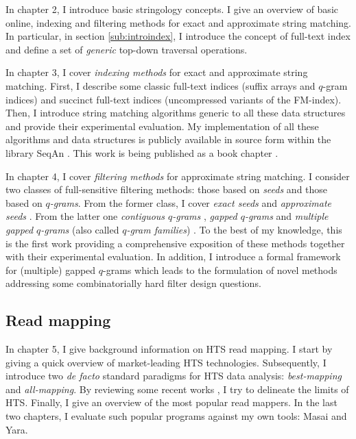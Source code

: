 In chapter 2, I introduce basic stringology concepts.
I give an overview of basic online, indexing and filtering methods for exact and approximate string matching.
In particular, in section \ref{sub:introindex}, I introduce the concept of full-text index and define a set of \emph{generic} top-down traversal operations.

In chapter 3, I cover \emph{indexing methods} for exact and approximate string matching.
First, I describe some classic full-text indices (suffix arrays and $q$-gram indices) and succinct full-text indices (uncompressed variants of the FM-index).
Then, I introduce string matching algorithms generic to all these data structures and provide their experimental evaluation.
My implementation of all these algorithms and data structures is publicly available in source form within the \CC library SeqAn \citep{Doering2008}.
This work is being published as a book chapter \citep{Weese2015}.

In chapter 4, I cover \emph{filtering methods} for approximate string matching.
I consider two classes of full-sensitive filtering methods: those based on \emph{seeds} and those based on \emph{$q$-grams}.
From the former class, I cover
\emph{exact seeds} \citep{Baeza1992} and
\emph{approximate seeds} \citep{Myers1994,Navarro2000}.
From the latter one
\emph{contiguous $q$-grams} \citep{Jokinen1991},
\emph{gapped $q$-grams} \citep{Burkhardt2001} and
\emph{multiple gapped $q$-grams} (also called \emph{$q$-gram families}) \citep{Kucherov2005}.
To the best of my knowledge, this is the first work providing a comprehensive exposition of these methods together with their experimental evaluation.
In addition, I introduce a formal framework for (multiple) gapped $q$-grams which leads to the formulation of novel methods addressing some combinatorially hard filter design questions.

\subsection{Read mapping}

In chapter 5, I give background information on HTS read mapping.
I start by giving a quick overview of market-leading HTS technologies.
Subsequently, I introduce two \emph{de facto} standard paradigms for HTS data analysis: \emph{best-mapping} and \emph{all-mapping}.
By reviewing some recent works \citep{Derrien2012,Lee2012}, I try to delineate the limits of HTS.
Finally, I give an overview of the most popular read mappers.
In the last two chapters, I evaluate such popular programs against my own tools: Masai \citep{Siragusa2013} and Yara.

